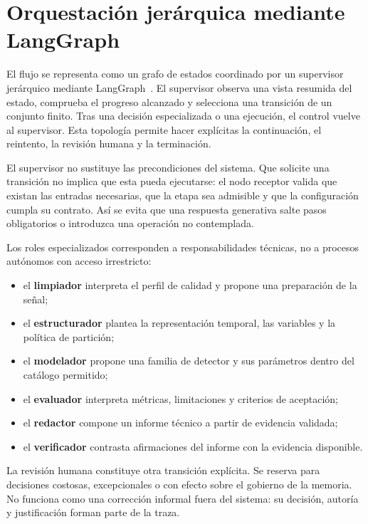 \section{Orquestación jerárquica mediante LangGraph}

El flujo se representa como un grafo de estados coordinado por un supervisor
jerárquico mediante LangGraph~\cite{langgraph_documentation}. El supervisor
observa una vista resumida del estado, comprueba el
progreso alcanzado y selecciona una transición de un conjunto finito. Tras una
decisión especializada o una ejecución, el control vuelve al supervisor. Esta
topología permite hacer explícitas la continuación, el reintento, la revisión
humana y la terminación.

El supervisor no sustituye las precondiciones del sistema. Que solicite una
transición no implica que esta pueda ejecutarse: el nodo receptor valida que
existan las entradas necesarias, que la etapa sea admisible y que la
configuración cumpla su contrato. Así se evita que una respuesta generativa
salte pasos obligatorios o introduzca una operación no contemplada.

Los roles especializados corresponden a responsabilidades técnicas, no a
procesos autónomos con acceso irrestricto:

\begin{itemize}
  \item el \textbf{limpiador} interpreta el perfil de calidad y propone una
        preparación de la señal;
  \item el \textbf{estructurador} plantea la representación temporal, las
        variables y la política de partición;
  \item el \textbf{modelador} propone una familia de detector y sus parámetros
        dentro del catálogo permitido;
  \item el \textbf{evaluador} interpreta métricas, limitaciones y criterios de
        aceptación;
  \item el \textbf{redactor} compone un informe técnico a partir de evidencia
        validada;
  \item el \textbf{verificador} contrasta afirmaciones del informe con la
        evidencia disponible.
\end{itemize}

La revisión humana constituye otra transición explícita. Se reserva para
decisiones costosas, excepcionales o con efecto sobre el gobierno de la
memoria. No funciona como una corrección informal fuera del sistema: su
decisión, autoría y justificación forman parte de la traza.

